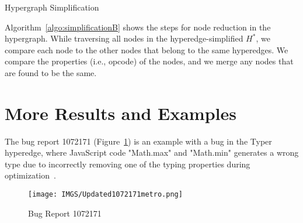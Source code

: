 \documentclass[runningheads]{llncs}
\begin{document}
\begin{appendices}
\IncMargin{1em}
\begin{algorithm}  %
 \DontPrintSemicolon
 \BlankLine
 \BlankLine
\caption{Hypergraph Simplification}
\label{algo:simplificationB}
\end{algorithm}
Algorithm~\ref{algo:simplificationB} shows the steps for node reduction in the hypergraph. While traversing all nodes in the hyperedge-simplified $H^*$, we compare each node to the other nodes that belong to the same hyperedges. We compare the properties (i.e., opcode) of the nodes, and we merge any nodes that are found to be the same. 

\clearpage

\section{More Results and Examples}\label{sec:moreres}

The bug report 1072171 (Figure~\ref{fig:1072171}) is an example with a bug in the Typer hyperedge, where JavaScript code "Math.max" and "Math.min" generates a wrong type due to incorrectly removing one of the typing properties during  optimization~\cite{DBLP:conf/vee/LimD21,issue1072172}.

\begin{figure}[h]
    \texttt{[image: IMGS/Updated1072171metro.png]}
    \caption{Bug Report 1072171}
    \label{fig:1072171}
\end{figure}


\end{appendices}
\end{document}
